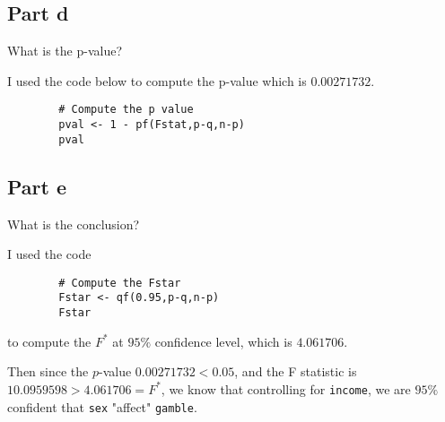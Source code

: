 \subsection{Part d}

\begin{question}
    What is the p-value?
\end{question}

\begin{answer}
    I used the code below to compute the p-value which is $0.00271732$.
    \begin{verbatim}
        # Compute the p value
        pval <- 1 - pf(Fstat,p-q,n-p)
        pval
    \end{verbatim}
\end{answer}

\subsection{Part e}

\begin{question}
    What is the conclusion?
\end{question}

\begin{answer}
    I used the code
    \begin{verbatim}
        # Compute the Fstar
        Fstar <- qf(0.95,p-q,n-p)
        Fstar
    \end{verbatim}
    to compute the $F^{*}$ at $95\%$ confidence level, which is $4.061706$.
    
    Then since the $p$-value $0.00271732 < 0.05$, and the F statistic is $10.0959598 > 4.061706 = F^{*}$, we know that controlling for \verb+income+, we are $95\%$ confident that \verb+sex+ "affect" \verb+gamble+.
\end{answer}
